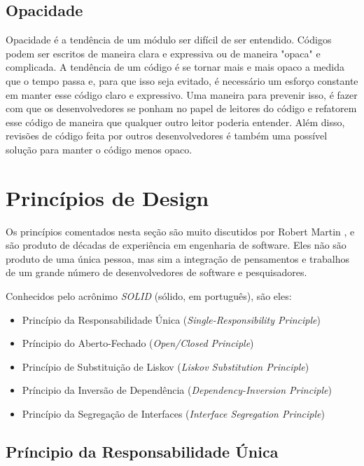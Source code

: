 \subsection{Opacidade}

Opacidade é a tendência de um módulo ser difícil de ser entendido. Códigos podem ser escritos de maneira clara e expressiva ou de maneira "opaca" e complicada.
A tendência de um código é se tornar mais e mais opaco a medida que o tempo passa e, para que isso seja evitado, é necessário um esforço constante em 
manter esse código claro e expressivo. Uma maneira para prevenir isso, é fazer com que os desenvolvedores se ponham no papel de leitores do código e
refatorem esse código de maneira que qualquer outro leitor poderia entender. Além disso, revisões de código feita por outros desenvolvedores é também
uma possível solução para manter o código menos opaco.


\section{Princípios de Design}
\label{sec:design-oo-principios}

Os princípios comentados nesta seção são muito discutidos por Robert Martin \cite{bob-martin}, e são produto de 
décadas de experiência em engenharia de software.
Eles não são produto de uma única pessoa, mas sim a integração de pensamentos e trabalhos de um grande número de
desenvolvedores de software e pesquisadores.

Conhecidos pelo acrônimo \textit{SOLID} (sólido, em português), são eles:

\begin{itemize}
	\item Princípio da Responsabilidade Única (\textit{Single-Responsibility Principle})
	\item Príncipio do Aberto-Fechado (\textit{Open/Closed Principle})
	\item Princípio de Substituição de Liskov (\textit{Liskov Substitution Principle})
	\item Príncipio da Inversão de Dependência (\textit{Dependency-Inversion Principle})
	\item Princípio da Segregação de Interfaces (\textit{Interface Segregation Principle})
\end{itemize}

\subsection{Príncipio da Responsabilidade Única}
\label{subsec:principio-srp}


